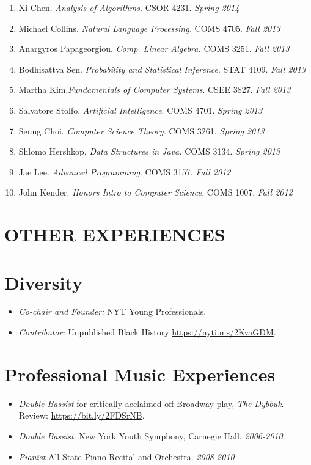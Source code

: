 \documentclass[margin]{res}
\newcommand{\fullhrulefill}{%
	\vspace{.7\baselineskip}
	\hspace*{-\sectionwidth}\hrulefill%
}
\begin{document}
\begin{resume}
\begin{enumerate}
	\item Xi Chen. \textit{Analysis of Algorithms.} CSOR 4231. \hfill \textit{Spring 2014}
	\item Michael Collins.\textit{ Natural Language Processing.} COMS 4705. \hfill \textit{Fall 2013}
	\item Anargyros Papageorgiou. \textit{Comp. Linear Algebra.} COMS 3251. \hfill \textit{Fall 2013}
	\item Bodhisattva Sen. \textit{Probability and Statistical Inference}. STAT 4109. \hfill \textit{Fall 2013}
	\item Martha Kim.\textit{Fundamentals of Computer Systems}. CSEE 3827. \hfill \textit{Fall 2013}
	\item Salvatore Stolfo. \textit{Artificial Intelligence}. COMS 4701. \hfill \textit{Spring 2013}
	\item Seung Choi. \textit{Computer Science Theory.} COMS 3261. \hfill \textit{Spring 2013}
	\item Shlomo Hershkop. \textit{Data Structures in Java.} COMS 3134. \hfill \textit{Spring 2013}
	\item Jae Lee. \textit{Advanced Programming}. COMS 3157. \hfill \textit{Fall 2012}
	\item John Kender. \textit{Honors Intro to Computer Science.} COMS 1007. \hfill \textit{Fall 2012}
\end{enumerate}

\vspace{1\baselineskip}
\section{OTHER EXPERIENCES}
\vspace{1\baselineskip}
\fullhrulefill

\section{Diversity}
\begin{itemize}
	\item {\sl Co-chair and Founder:} NYT Young Professionals.
	\item {\sl Contributor:} Unpublished Black History \url{https://nyti.ms/2KvaGDM}.
\end{itemize}
\section{Professional Music Experiences}
\begin{itemize}
	\item {\sl Double Bassist} for critically-acclaimed off-Broadway play, \textit{The Dybbuk}. Review: \url{https://bit.ly/2FDSrNB}.
	\item {\sl Double Bassist}. New York Youth Symphony, Carnegie Hall. \hfill \textit{2006-2010}.
	\item \textit{Pianist} All-State Piano Recital and Orchestra. \hfill \textit{2008-2010}
\end{itemize}



\end{resume}
\end{document}
